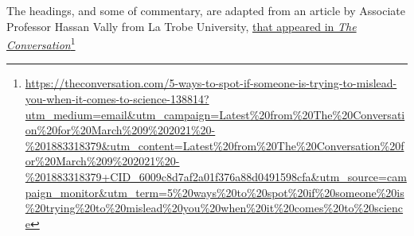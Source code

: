 \documentclass[
  10pt,
  b5paper]{book}
\begin{document}
The headings, and some of commentary, are adapted from an article by
Associate Professor Hassan Vally from La Trobe University,
\href{https://theconversation.com/5-ways-to-spot-if-someone-is-trying-to-mislead-you-when-it-comes-to-science-138814?utm_medium=email\&utm_campaign=Latest\%20from\%20The\%20Conversation\%20for\%20March\%209\%202021\%20-\%201883318379\&utm_content=Latest\%20from\%20The\%20Conversation\%20for\%20March\%209\%202021\%20-\%201883318379+CID_6009c8d7af2a01f376a88d0491598cfa\&utm_source=campaign_monitor\&utm_term=5\%20ways\%20to\%20spot\%20if\%20someone\%20is\%20trying\%20to\%20mislead\%20you\%20when\%20it\%20comes\%20to\%20science}{that appeared in \emph{The Conversation}}\footnote{\url{https://theconversation.com/5-ways-to-spot-if-someone-is-trying-to-mislead-you-when-it-comes-to-science-138814?utm_medium=email\&utm_campaign=Latest\%20from\%20The\%20Conversation\%20for\%20March\%209\%202021\%20-\%201883318379\&utm_content=Latest\%20from\%20The\%20Conversation\%20for\%20March\%209\%202021\%20-\%201883318379+CID_6009c8d7af2a01f376a88d0491598cfa\&utm_source=campaign_monitor\&utm_term=5\%20ways\%20to\%20spot\%20if\%20someone\%20is\%20trying\%20to\%20mislead\%20you\%20when\%20it\%20comes\%20to\%20science}}
\end{document}

